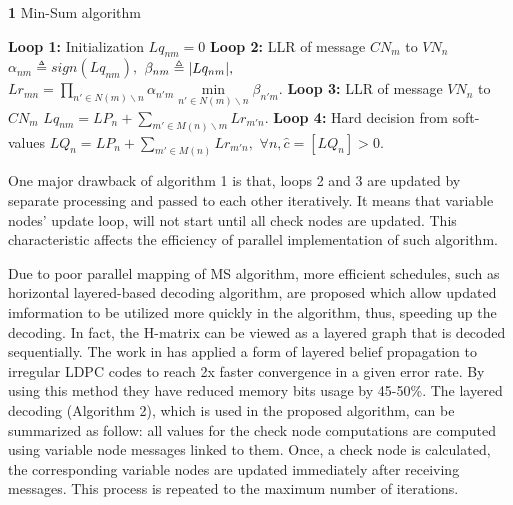 \documentclass[conference]{IEEEtran}
\DeclarePairedDelimiter\abs{\lvert}{\rvert}%
\begin{document}
\begin{algorithm}
\renewcommand\thealgorithm{}
\caption{\textbf{1} Min-Sum algorithm}\label{algorithm1}
\begin{algorithmic}[1]
\STATE \textbf{Loop 1:} Initialization
\STATE
$Lq_{nm}=0$%
\ENDFOR
{}
\STATE \textbf{Loop 2:} LLR of message $CN_m$ to $VN_n$
\STATE $\alpha_{nm} \triangleq sign(Lq_{nm}),$
\STATE $\beta_{nm} \triangleq \abs{Lq_{nm}},$
\STATE $Lr_{mn} = \prod\limits_{n' \in N(m)\backslash n} \alpha_{n'm} \min\limits_{n' \in N(m)\backslash n} \beta_{n'm}.$
\ENDFOR
\STATE \textbf{Loop 3:} LLR of message $VN_n$ to $CN_m$
\STATE $Lq_{nm} = LP_n + \sum\limits_{m' \in M(n)\backslash m} Lr_{m'n}.$
\ENDFOR  
\ENDFOR %
\STATE \textbf{Loop 4:} Hard decision from soft-values
\STATE $LQ_{n} = LP_n + \sum\limits_{m' \in M(n)} Lr_{m'n},$
\STATE $\forall n, \hat{c}=[LQ_n]>0.$
\ENDFOR
\end{algorithmic}
\addtocounter{algorithm}{-1}
\end{algorithm}

One major drawback of algorithm 1 is that, loops 2 and 3 are updated by separate processing and passed to each other iteratively. It means that variable nodes' update loop, will not start until all check nodes are updated. This characteristic affects the efficiency of parallel implementation of such algorithm. 

Due to poor parallel mapping of MS algorithm, more efficient schedules, such as horizontal layered-based decoding algorithm, are proposed which allow updated imformation to be utilized more quickly in the algorithm, thus, speeding up the decoding\cite{art_layered0, art_layered1}. In fact, the H-matrix can be viewed as a layered graph that is decoded sequentially. The work in \cite{art_gpu_0} has applied a form of layered belief propagation to irregular LDPC codes to reach 2x faster convergence in a given error rate. By using this method they have reduced memory bits usage by 45-50\%. The layered decoding (Algorithm 2), which is used in the proposed algorithm, can be summarized as follow: all values for the check node computations are computed using variable node messages linked to them. Once, a check node is calculated, the corresponding variable nodes are updated immediately after receiving messages. This process is repeated to the maximum number of iterations.
\end{document}
